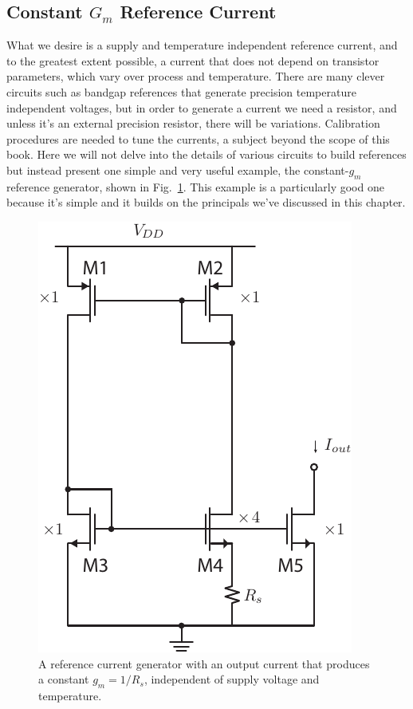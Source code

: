 \subsection{Constant \texorpdfstring{$G_m$}{Transconductance} Reference Current}
What we desire is a supply and temperature independent reference current, and to the greatest extent possible, a current that does not depend on transistor parameters, which vary over process and temperature.  There are many clever circuits such as bandgap references that generate precision temperature independent voltages, but in order to generate a current we need a resistor, and unless it's an external precision resistor, there will be variations.  Calibration procedures are needed to tune the currents, a subject beyond the scope of this book.
Here we will not delve into the details of various circuits to build references but instead present one simple and very useful example, the constant-$g_m$ reference generator, shown in Fig.~\ref{fig:constant_gm_ref}.  This example is a particularly good one because it's simple and it builds on the principals we've discussed in this chapter.
\begin{figure}[tb]
\centering
\includegraphics[scale=1]{constant_gm_bias.pdf}
\caption{A reference current generator with an output current that produces a constant $g_m = 1/R_s$, independent of supply voltage and temperature.}
\label{fig:constant_gm_ref}
\end{figure}
